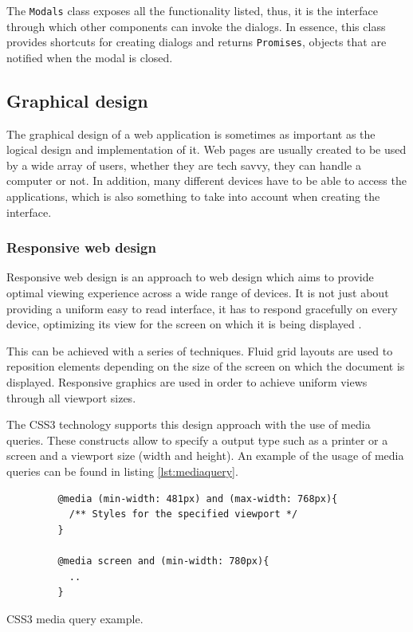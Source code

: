 The \texttt{Modals} class exposes all the functionality listed, thus, it is the interface through which other components can invoke the dialogs. In essence, this class provides shortcuts for creating dialogs and returns \texttt{Promises}, objects that are notified when the modal is closed.

\FloatBarrier
\subsection{Graphical design}

The graphical design of a web application is sometimes as important as the logical design and implementation of it. Web pages are usually created to be used by a wide array of users, whether they are tech savvy, they can handle a computer or not. In addition, many different devices have to be able to access the applications, which is also something to take into account when creating the interface.

\subsubsection*{Responsive web design}

Responsive web design is an approach to web design which aims to provide optimal viewing experience across a wide range of devices. It is not just about providing a uniform easy to read interface, it has to respond gracefully on every device, optimizing its view for the screen on which it is being displayed \cite{rwd}.

This can be achieved with a series of techniques. Fluid grid layouts are used to reposition elements depending on the size of the screen on which the document is displayed. Responsive graphics are used in order to achieve uniform views through all viewport sizes.

The CSS3 technology supports this design approach with the use of media queries. These constructs allow to specify a output type such as a printer or a screen and a viewport size (width and height). An example of the usage of media queries can be found in listing \ref{lst:mediaquery}.

\begin{listing}[ht]\centering
  \begin{minipage}{.6\textwidth}
    \begin{verbatim}
	     @media (min-width: 481px) and (max-width: 768px){
	       /** Styles for the specified viewport */
	     }
	     
	     @media screen and (min-width: 780px){
	       ..
	     }
    \end{verbatim}
  \end{minipage}
  \caption{CSS3 media query example.}\label{lst:mediaquery}
\end{listing}

